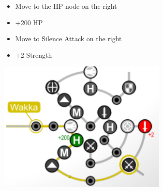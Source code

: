 \begin{multicols}{2}
\begin{spheregrid}
\begin{itemize}
    \wakkaf
    \begin{itemize}
      \item Move to the HP node on the right
      \item +200 HP
      \item Move to Silence Attack on the right
      \item +2 Strength
    \end{itemize}
    \includegraphics{graphics/wakkammr}
  \end{itemize}
\end{spheregrid}


\end{multicols}
